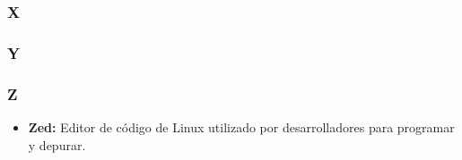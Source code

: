 \subsubsection*{X}

\subsubsection*{Y}

\subsubsection*{Z}
\begin{itemize}
 \item \textbf{Zed:} Editor de código de Linux utilizado por desarrolladores para programar y depurar.
\end{itemize}

